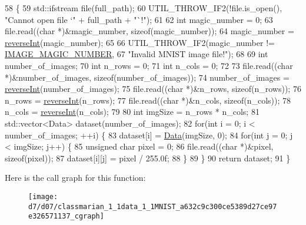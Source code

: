 \begin{DoxyCode}
58                                                          \{
59     std::ifstream file(full\_path);
60     UTIL\_THROW\_IF2(!file.is\_open(), \textcolor{stringliteral}{"Cannot open file `"} + full\_path + \textcolor{stringliteral}{"`!"});
61 
62     \textcolor{keywordtype}{int} magic\_number = 0;
63     file.read((\textcolor{keywordtype}{char} *)&magic\_number, \textcolor{keyword}{sizeof}(magic\_number));
64     magic\_number = \hyperlink{classmarian_1_1data_1_1MNIST_a631d1fd994e50776b4daf8c9853c0f88}{reverseInt}(magic\_number);
65 
66     UTIL\_THROW\_IF2(magic\_number != \hyperlink{classmarian_1_1data_1_1MNIST_ad57aae96aaef230ede91eadb4d2cbbb7}{IMAGE\_MAGIC\_NUMBER},
67                    \textcolor{stringliteral}{"Invalid MNIST image file!"});
68 
69     \textcolor{keywordtype}{int} number\_of\_images;
70     \textcolor{keywordtype}{int} n\_rows = 0;
71     \textcolor{keywordtype}{int} n\_cols = 0;
72 
73     file.read((\textcolor{keywordtype}{char} *)&number\_of\_images, \textcolor{keyword}{sizeof}(number\_of\_images));
74     number\_of\_images = \hyperlink{classmarian_1_1data_1_1MNIST_a631d1fd994e50776b4daf8c9853c0f88}{reverseInt}(number\_of\_images);
75     file.read((\textcolor{keywordtype}{char} *)&n\_rows, \textcolor{keyword}{sizeof}(n\_rows));
76     n\_rows = \hyperlink{classmarian_1_1data_1_1MNIST_a631d1fd994e50776b4daf8c9853c0f88}{reverseInt}(n\_rows);
77     file.read((\textcolor{keywordtype}{char} *)&n\_cols, \textcolor{keyword}{sizeof}(n\_cols));
78     n\_cols = \hyperlink{classmarian_1_1data_1_1MNIST_a631d1fd994e50776b4daf8c9853c0f88}{reverseInt}(n\_cols);
79 
80     \textcolor{keywordtype}{int} imgSize = n\_rows * n\_cols;
81     std::vector<Data> dataset(number\_of\_images);
82     \textcolor{keywordflow}{for}(\textcolor{keywordtype}{int} i = 0; i < number\_of\_images; ++i) \{
83       dataset[i] = \hyperlink{namespacemarian_1_1data_a5801e80ecb76ee38a5ac080f08d9646c}{Data}(imgSize, 0);
84       \textcolor{keywordflow}{for}(\textcolor{keywordtype}{int} j = 0; j < imgSize; j++) \{
85         \textcolor{keywordtype}{unsigned} \textcolor{keywordtype}{char} pixel = 0;
86         file.read((\textcolor{keywordtype}{char} *)&pixel, \textcolor{keyword}{sizeof}(pixel));
87         dataset[i][j] = pixel / 255.0f;
88       \}
89     \}
90     \textcolor{keywordflow}{return} dataset;
91   \}
\end{DoxyCode}


Here is the call graph for this function\+:
\nopagebreak
\begin{figure}[H]
\begin{center}
\leavevmode
\texttt{[image: d7/d07/classmarian\_1\_1data\_1\_1MNIST\_a632c9c300ce5389d27ce97e326571137\_cgraph]}
\end{center}
\end{figure}




